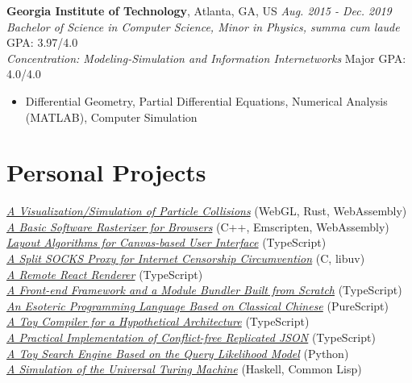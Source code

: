 \documentclass[11pt]{article}
\begin{document}
\vspace{1em}
\textbf{Georgia Institute of Technology}, Atlanta, GA, US \hfill \textit{Aug. 2015 - Dec. 2019}\\
\textit{Bachelor of Science in Computer Science, Minor in Physics, \textit{summa cum laude}} \hfill GPA: 3.97/4.0\\
\textit{Concentration: Modeling-Simulation and Information Internetworks} \hfill Major GPA: 4.0/4.0
\begin{itemize}
\item Differential Geometry, Partial Differential Equations, Numerical Analysis (MATLAB), Computer Simulation
\end{itemize}

\section*{Personal Projects}
\href{https://github.com/galmungral/particle-simulation}{\textit{A Visualization/Simulation of Particle Collisions}} \hfill (WebGL, Rust, WebAssembly) \\
\href{https://github.com/galmungral/rasterizer}{\textit{A Basic Software Rasterizer for Browsers}} \hfill (C++, Emscripten, WebAssembly) \\
\href{https://github.com/galmungral/michelangelo}{\textit{Layout Algorithms for Canvas-based User Interface}} \hfill (TypeScript) \\
\href{https://github.com/galmungral/telescope}{\textit{A Split SOCKS Proxy for Internet Censorship Circumvention}} \hfill (C, libuv) \\
\href{https://github.com/galmungral/react-teletype}{\textit{A Remote React Renderer}} \hfill (TypeScript) \\
\href{https://github.com/galmungral/replay}{\textit{A Front-end Framework and a Module Bundler Built from Scratch}} \hfill (TypeScript) \\
\href{https://github.com/galmungral/hanbun-lang}{\textit{An Esoteric Programming Language Based on Classical Chinese}} \hfill (PureScript) \\
\href{https://github.com/galmungral/sketchpad}{\textit{A Toy Compiler for a Hypothetical Architecture}} \hfill (TypeScript) \\
\href{https://github.com/galmungral/json-crdt}{\textit{A Practical Implementation of Conflict-free Replicated JSON}} \hfill (TypeScript) \\
\href{https://github.com/galmungral/plato}{\textit{A Toy Search Engine Based on the Query Likelihood Model}} \hfill (Python) \\
\href{https://github.com/galmungral/turing-machine}{\textit{A Simulation of the Universal Turing Machine}} \hfill (Haskell, Common Lisp) \\
\end{document}
